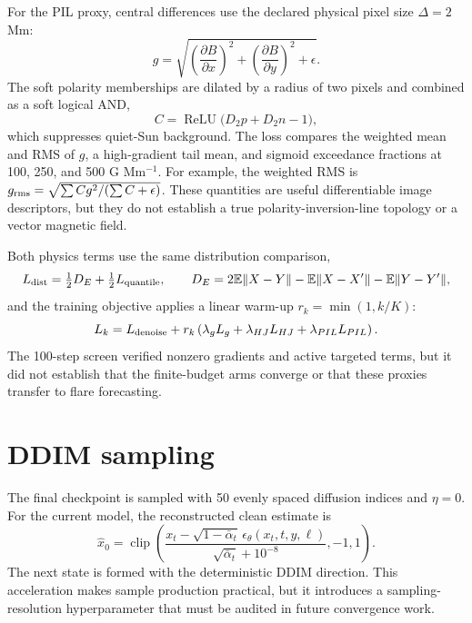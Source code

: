 \documentclass[11pt,oneside]{report}
\begin{document}
For the PIL proxy, central differences use the declared physical pixel size $\Delta=2$ Mm:
\begin{equation}
  g=\sqrt{\left(\frac{\partial B}{\partial x}\right)^2+\left(\frac{\partial B}{\partial y}\right)^2+\epsilon}.
\end{equation}
The soft polarity memberships are dilated by a radius of two pixels and combined as a soft logical AND,
\begin{equation}
  C=\operatorname{ReLU}\bigl(D_2p+D_2n-1\bigr),
\end{equation}
which suppresses quiet-Sun background. The loss compares the weighted mean and RMS of $g$, a high-gradient tail mean, and sigmoid exceedance fractions at 100, 250, and 500 G Mm$^{-1}$. For example, the weighted RMS is $g_{\rm rms}=\sqrt{\sum Cg^2/(\sum C+\epsilon)}$. These quantities are useful differentiable image descriptors, but they do not establish a true polarity-inversion-line topology or a vector magnetic field.

Both physics terms use the same distribution comparison,
\begin{equation}
  L_{\rm dist}=\tfrac12D_E+\tfrac12L_{\rm quantile}, \qquad
  D_E=2\mathbb{E}\|X-Y\|-\mathbb{E}\|X-X'\|-\mathbb{E}\|Y-Y'\|,
\end{equation}
and the training objective applies a linear warm-up $r_k=\min(1,k/K)$:
\begin{equation}
  L_k=L_{\rm denoise}+r_k\left(\lambda_gL_g+\lambda_{HJ}L_{HJ}+\lambda_{PIL}L_{PIL}\right).
\end{equation}
The 100-step screen verified nonzero gradients and active targeted terms, but it did not establish that the finite-budget arms converge or that these proxies transfer to flare forecasting.

\section{DDIM sampling}

The final checkpoint is sampled with 50 evenly spaced diffusion indices and $\eta=0$. For the current model, the reconstructed clean estimate is
\begin{equation}
  \widehat{x}_0 = \operatorname{clip}\left(\frac{x_t-\sqrt{1-\bar\alpha_t}\,\epsilon_\theta(x_t,t,y,\ell)}{\sqrt{\bar\alpha_t}+10^{-8}},-1,1\right).
\end{equation}
The next state is formed with the deterministic DDIM direction. This acceleration makes sample production practical, but it introduces a sampling-resolution hyperparameter that must be audited in future convergence work.
\end{document}

